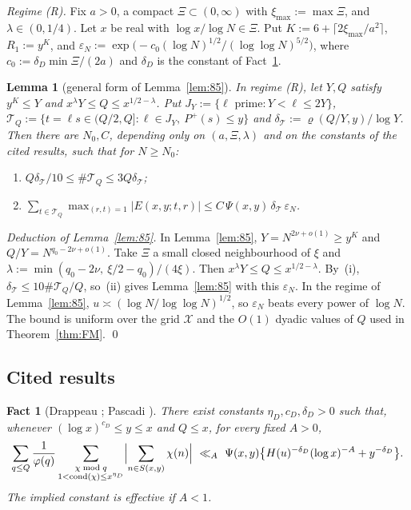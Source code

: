 \documentclass[11pt]{amsart}
\newtheorem{lemma}[theorem]{Lemma}
\newtheorem{fact}[theorem]{Fact}
\theoremstyle{definition}
\newcommand{\cT}{\mathcal{T}}
\newcommand{\cX}{\mathcal{X}}
\newcommand{\Pp}{P^{+}}
\begin{document}
\emph{Regime (R).} Fix $a>0$, a compact $\Xi\subset(0,\infty)$ with $\xi_{\max}:=\max\Xi$, and $\lambda\in(0,1/4)$. Let
$x$ be real with $\log x/\log N\in\Xi$. Put $K:=6+\lceil2\xi_{\max}/a^2\rceil$, $R_1:=y^K$, and
$\varepsilon_N:=\exp\bigl(-c_0(\log N)^{1/2}/(\log\log N)^{5/2}\bigr)$, where $c_0:=\delta_D\min\Xi/(2a)$ and $\delta_D$ is the constant of
Fact~\ref{fact:D}.

\begin{lemma}[general form of Lemma~\ref{lem:85}]\label{lem:85gen}
In regime (R), let $Y,Q$ satisfy $y^K\le Y$ and $x^\lambda Y\le Q\le x^{1/2-\lambda}$. Put $J_Y:=\{\ell\text{ prime}:Y<\ell\le2Y\}$,
$\cT_Q:=\{t=\ell s\in(Q/2,Q]:\ell\in J_Y,\ \Pp(s)\le y\}$ and $\delta_\cT:=\varrho(Q/Y,y)/\log Y$. Then there are $N_0,C$, depending only
on $(a,\Xi,\lambda)$ and on the constants of the cited results, such that for $N\ge N_0$:
\begin{enumerate}[label=(\roman*)]
\item $Q\delta_\cT/10\le\#\cT_Q\le3Q\delta_\cT$;
\item $\sum_{t\in\cT_Q}\max_{(r,t)=1}|E(x,y;t,r)|\le C\,\Psi(x,y)\,\delta_\cT\,\varepsilon_N$.
\end{enumerate}
\end{lemma}

\emph{Deduction of Lemma~\ref{lem:85}.} In Lemma~\ref{lem:85}, $Y=N^{2\nu+o(1)}\ge y^K$ and $Q/Y=N^{q_0-2\nu+o(1)}$. Take $\Xi$ a small
closed neighbourhood of $\xi$ and $\lambda:=\min(q_0-2\nu,\ \xi/2-q_0)/(4\xi)$. Then $x^\lambda Y\le Q\le x^{1/2-\lambda}$. By~(i),
$\delta_\cT\le10\#\cT_Q/Q$, so~(ii) gives Lemma~\ref{lem:85} with this $\varepsilon_N$. In the regime of Lemma~\ref{lem:85},
$u\asymp(\log N/\log\log N)^{1/2}$, so $\varepsilon_N$ beats every power of $\log N$. The bound is uniform over the grid $\cX$ and the
$O(1)$ dyadic values of $Q$ used in Theorem~\ref{thm:FM}. \qed

\subsection{Cited results}

\begin{fact}[Drappeau {\cite[Lemme~5]{drappeau2015}}; Pascadi {\cite[Lemma~3.2]{pascadi2025}}]\label{fact:D}
There exist constants $\eta_D,c_D,\delta_D>0$ such that, whenever $(\log x)^{c_D}\le y\le x$ and $Q\le x$, for every fixed $A>0$,
\[
\sum_{q\le Q}\frac1{\varphi(q)}\sum_{\substack{\chi\bmod q\\1<\mathrm{cond}(\chi)\le x^{\eta_D}}}\Bigl|\sum_{n\in S(x,y)}\chi(n)\Bigr|\ \ll_A\
\Psi(x,y)\bigl\{H(u)^{-\delta_D}(\log x)^{-A}+y^{-\delta_D}\bigr\}.
\]
The implied constant is effective if $A<1$.
\end{fact}
\end{document}

